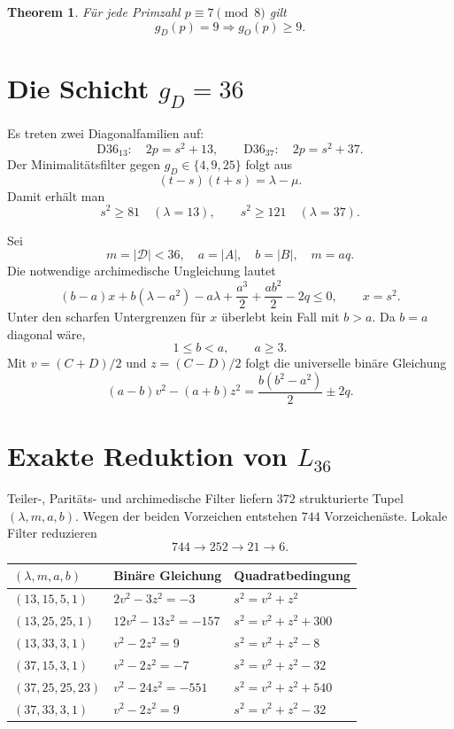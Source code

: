 \documentclass[11pt,a4paper]{article}
\newtheorem{theorem}{Theorem}[section]
\theoremstyle{definition}
\newcommand{\Def}{\mathscr D}
\begin{document}
\begin{theorem}
Für jede Primzahl \(p\equiv7\pmod8\) gilt
\[
\boxed{g_D(p)=9\Longrightarrow g_O(p)\ge9.}
\]
\end{theorem}

\section{Die Schicht \(g_D=36\)}
Es treten zwei Diagonalfamilien auf:
\[
\mathrm{D36}_{13}:\quad 2p=s^2+13,
\qquad
\mathrm{D36}_{37}:\quad 2p=s^2+37.
\]
Der Minimalitätsfilter gegen \(g_D\in\{4,9,25\}\) folgt aus
\[
(t-s)(t+s)=\lambda-\mu.
\]
Damit erhält man
\[
s^2\ge81\quad(\lambda=13),
\qquad
s^2\ge121\quad(\lambda=37).
\]

Sei
\[
m=|\Def|<36,\quad a=|A|,\quad b=|B|,\quad m=aq.
\]
Die notwendige archimedische Ungleichung lautet
\[
(b-a)x+b(\lambda-a^2)-a\lambda+\frac{a^3}{2}
+\frac{ab^2}{2}-2q\le0,
\qquad x=s^2.
\]
Unter den scharfen Untergrenzen für \(x\) überlebt kein Fall mit \(b>a\). Da \(b=a\) diagonal wäre,
\[
\boxed{1\le b<a,\qquad a\ge3.}
\]
Mit \(v=(C+D)/2\) und \(z=(C-D)/2\) folgt die universelle binäre Gleichung
\[
\boxed{
(a-b)v^2-(a+b)z^2
=
\frac{b(b^2-a^2)}2\pm2q.
}
\]

\section{Exakte Reduktion von \(L_{36}\)}
Teiler-, Paritäts- und archimedische Filter liefern \(372\) strukturierte Tupel \((\lambda,m,a,b)\). Wegen der beiden Vorzeichen entstehen \(744\) Vorzeichenäste. Lokale Filter reduzieren
\[
744\longrightarrow252\longrightarrow21\longrightarrow6.
\]

\begin{longtable}{@{}lll@{}}
\toprule
\((\lambda,m,a,b)\) & Binäre Gleichung & Quadratbedingung\\
\midrule
\endhead
\((13,15,5,1)\) & \(2v^2-3z^2=-3\) & \(s^2=v^2+z^2\)\\
\((13,25,25,1)\) & \(12v^2-13z^2=-157\) & \(s^2=v^2+z^2+300\)\\
\((13,33,3,1)\) & \(v^2-2z^2=9\) & \(s^2=v^2+z^2-8\)\\
\((37,15,3,1)\) & \(v^2-2z^2=-7\) & \(s^2=v^2+z^2-32\)\\
\((37,25,25,23)\) & \(v^2-24z^2=-551\) & \(s^2=v^2+z^2+540\)\\
\((37,33,3,1)\) & \(v^2-2z^2=9\) & \(s^2=v^2+z^2-32\)\\
\bottomrule
\end{longtable}
\end{document}
